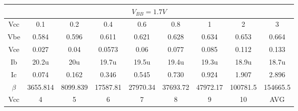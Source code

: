 \begin{table}[h]
\centering
\begin{tabular}{|ccccccccc|}
\hline
\multicolumn{9}{|c|}{$V_{BB}=1.7V$}                                                                                                                                                                                                                                      \\ \hline
\multicolumn{1}{|c|}{Vcc}     & \multicolumn{1}{c|}{0.1}      & \multicolumn{1}{c|}{0.2}      & \multicolumn{1}{c|}{0.4}      & \multicolumn{1}{c|}{0.6}      & \multicolumn{1}{c|}{0.8}      & \multicolumn{1}{c|}{1}        & \multicolumn{1}{c|}{2}        & 3        \\ \hline
\multicolumn{1}{|c|}{Vbe}     & \multicolumn{1}{c|}{0.584}    & \multicolumn{1}{c|}{0.596}    & \multicolumn{1}{c|}{0.611}    & \multicolumn{1}{c|}{0.621}    & \multicolumn{1}{c|}{0.628}    & \multicolumn{1}{c|}{0.634}    & \multicolumn{1}{c|}{0.653}    & 0.664    \\ \hline
\multicolumn{1}{|c|}{Vce}     & \multicolumn{1}{c|}{0.027}    & \multicolumn{1}{c|}{0.04}     & \multicolumn{1}{c|}{0.0573}   & \multicolumn{1}{c|}{0.06}     & \multicolumn{1}{c|}{0.077}    & \multicolumn{1}{c|}{0.085}    & \multicolumn{1}{c|}{0.112}    & 0.133    \\ \hline
\multicolumn{1}{|c|}{Ib}      & \multicolumn{1}{c|}{20.2u}    & \multicolumn{1}{c|}{20u}      & \multicolumn{1}{c|}{19.7u}    & \multicolumn{1}{c|}{19.5u}    & \multicolumn{1}{c|}{19.4u}    & \multicolumn{1}{c|}{19.3u}    & \multicolumn{1}{c|}{18.9u}    & 18.7u    \\ \hline
\multicolumn{1}{|c|}{Ic}      & \multicolumn{1}{c|}{0.074}    & \multicolumn{1}{c|}{0.162}    & \multicolumn{1}{c|}{0.346}    & \multicolumn{1}{c|}{0.545}    & \multicolumn{1}{c|}{0.730}    & \multicolumn{1}{c|}{0.924}    & \multicolumn{1}{c|}{1.907}    & 2.896    \\ \hline
\multicolumn{1}{|c|}{$\beta$} & \multicolumn{1}{c|}{3655.814} & \multicolumn{1}{c|}{8099.839} & \multicolumn{1}{c|}{17587.81} & \multicolumn{1}{c|}{27970.34} & \multicolumn{1}{c|}{37693.72} & \multicolumn{1}{c|}{47972.17} & \multicolumn{1}{c|}{100781.5} & 154665.5 \\ \hline
\multicolumn{1}{|c|}{Vcc}     & \multicolumn{1}{c|}{4}        & \multicolumn{1}{c|}{5}        & \multicolumn{1}{c|}{6}        & \multicolumn{1}{c|}{7}        & \multicolumn{1}{c|}{8}        & \multicolumn{1}{c|}{9}        & \multicolumn{1}{c|}{10}       & AVG      \\ \hline

\end{tabular}
\end{table}
